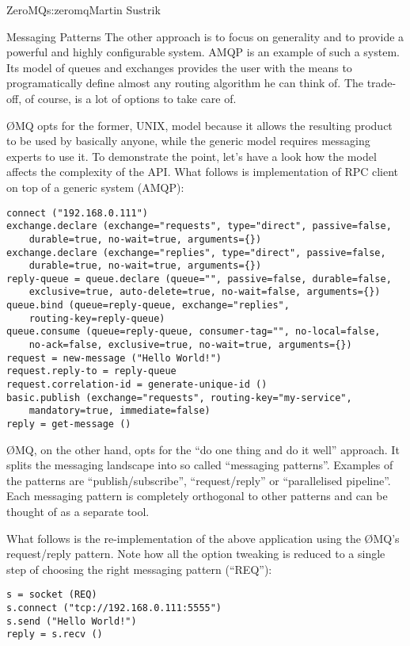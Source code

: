 \begin{aosachapter}{ZeroMQ}{s:zeromq}{Martin Sustrik}
\begin{aosasect1}{Messaging Patterns}
The other approach is to focus on generality and to provide a powerful
and highly configurable system. AMQP is an example of such a
system. Its model of queues and exchanges provides the user with the
means to programatically define almost any routing algorithm he can
think of. The trade-off, of course, is a lot of options to take care
of.

{\O}MQ opts for the former, UNIX, model because it allows the resulting
product to be used by basically anyone, while the generic model
requires messaging experts to use it. To demonstrate the point, let's
have a look how the model affects the complexity of the API. What
follows is implementation of RPC client on top of a generic system
(AMQP):

\begin{verbatim}
connect ("192.168.0.111")
exchange.declare (exchange="requests", type="direct", passive=false,
    durable=true, no-wait=true, arguments={})
exchange.declare (exchange="replies", type="direct", passive=false,
    durable=true, no-wait=true, arguments={})
reply-queue = queue.declare (queue="", passive=false, durable=false,
    exclusive=true, auto-delete=true, no-wait=false, arguments={})
queue.bind (queue=reply-queue, exchange="replies",
    routing-key=reply-queue)
queue.consume (queue=reply-queue, consumer-tag="", no-local=false,
    no-ack=false, exclusive=true, no-wait=true, arguments={})
request = new-message ("Hello World!")
request.reply-to = reply-queue
request.correlation-id = generate-unique-id ()
basic.publish (exchange="requests", routing-key="my-service",
    mandatory=true, immediate=false)
reply = get-message ()
\end{verbatim}

{\O}MQ, on the other hand, opts for the ``do one thing and do it well''
approach. It splits the messaging landscape into so called ``messaging
patterns''. Examples of the patterns are ``publish/subscribe'',
``request/reply'' or ``parallelised pipeline''. Each messaging pattern
is completely orthogonal to other patterns and can be thought of as a
separate tool.

What follows is the re-implementation of the above application using
the {\O}MQ's request/reply pattern. Note how all the option tweaking is
reduced to a single step of choosing the right messaging pattern
(``REQ''):

\begin{verbatim}
s = socket (REQ)
s.connect ("tcp://192.168.0.111:5555")
s.send ("Hello World!")
reply = s.recv ()
\end{verbatim}


\end{aosasect1}
\end{aosachapter}
